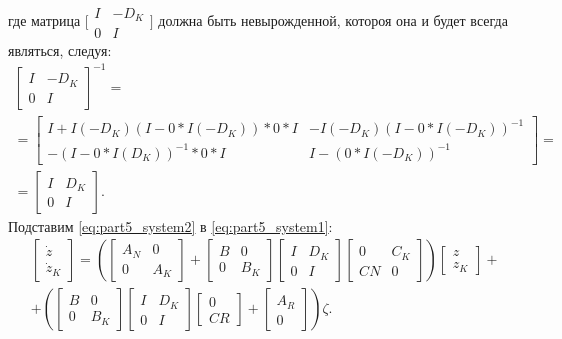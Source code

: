где матрица $\bigl[ \begin{smallmatrix}  {I} & -{D}_K \\ 0 & {I} \end{smallmatrix} \bigr]$ должна быть невырожденной, котороя она и будет всегда являться, следуя:
\begin{equation}
	\begin{gathered}
		\begin{bmatrix}
			{I} & -{D}_K \\ 0 & {I}
		\end{bmatrix}^{-1} = 
		\\
		=\begin{bmatrix}
			{I} + {I}(-{D}_K)({I}-0*{I}(-{D}_K))*0*{I} & -{I}(-{D}_K)({I}-0*{I}(-{D}_K))^{-1}\\
			-({I} - 0*{I}({D}_K))^{-1}*0*{I} &
			{I}-(0*{I}(-{D}_K))^{-1}
		\end{bmatrix}= \\
		=
		\begin{bmatrix}
			{I} & {D}_K \\ 0 & {I}
		\end{bmatrix}.
	\end{gathered}
\end{equation}
Подставим \eqref{eq:part5_system2} в \eqref{eq:part5_system1}:
\begin{align}
	\nonumber
	& \begin{bmatrix}
		{\dot{z}} \\ {\dot{z}}_K 
	\end{bmatrix}
	=\left(
	\begin{bmatrix}
		{A}_N & 0 \\
		0 & {A}_K
	\end{bmatrix}
	+
	\begin{bmatrix}
		{B} & 0 \\
		0 & {B}_K
	\end{bmatrix}
	\begin{bmatrix}
		{I} & {D}_K \\
		0 & {I}
	\end{bmatrix}
	\begin{bmatrix}
		0 & {C}_K \\
		{C}{N} & 0
	\end{bmatrix}
	\right)
	\begin{bmatrix}
		{z} \\ {z}_K
	\end{bmatrix}
	+ \\
	& + \left(
	\begin{bmatrix}
		{B} & 0 \\
		0 & {B}_K
	\end{bmatrix}
	\begin{bmatrix}
		{I} & {D}_K \\
		0 & {I}
	\end{bmatrix}
	\begin{bmatrix}
		0 \\ {C}{R}
	\end{bmatrix}
	+
	\begin{bmatrix}
		{A}_R \\ 0 
	\end{bmatrix}\right)
	{\zeta}.
\end{align}
